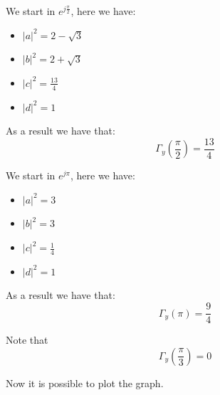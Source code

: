 We start in $e^{j\frac{\pi}{2}}$, here we have: 
\begin{itemize}
    \item $\left\lvert a \right\rvert^2=2-\sqrt{3}$
    \item $\left\lvert b \right\rvert^2=2+\sqrt{3}$
    \item $\left\lvert c \right\rvert^2=\frac{13}{4}$
    \item $\left\lvert d \right\rvert^2=1$
\end{itemize}
As a result we have that: 
\[\Gamma_y\left(\frac{\pi}{2}\right)=\dfrac{13}{4}\]

We start in $e^{j\pi}$, here we have: 
\begin{itemize}
    \item $\left\lvert a \right\rvert^2=3$
    \item $\left\lvert b \right\rvert^2=3$
    \item $\left\lvert c \right\rvert^2=\frac{1}{4}$
    \item $\left\lvert d \right\rvert^2=1$
\end{itemize}
As a result we have that: 
\[\Gamma_y\left(\pi\right)=\dfrac{9}{4}\]

Note that 
\[\Gamma_y\left(\frac{\pi}{3}\right)=0\]

Now it is possible to plot the graph. 